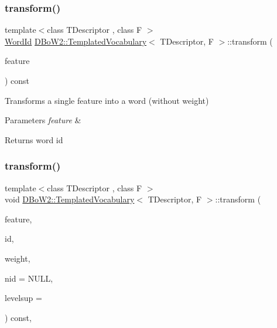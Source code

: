 \subsubsection{\texorpdfstring{transform()}{transform()}\hspace{0.1cm}{\footnotesize\ttfamily [3/5]}}
{\footnotesize\ttfamily template$<$class T\+Descriptor , class F $>$ \\
\mbox{\hyperlink{namespace_d_bo_w2_ab1a0d3283b2d4690a383372ed20bfeb5}{Word\+Id}} \mbox{\hyperlink{class_d_bo_w2_1_1_templated_vocabulary}{D\+Bo\+W2\+::\+Templated\+Vocabulary}}$<$ T\+Descriptor, F $>$\+::transform (\begin{DoxyParamCaption}\item[{const T\+Descriptor \&}]{feature }\end{DoxyParamCaption}) const\hspace{0.3cm}{\ttfamily [virtual]}}

Transforms a single feature into a word (without weight) 
\begin{DoxyParams}{Parameters}
{\em feature} & \\
\hline
\end{DoxyParams}
\begin{DoxyReturn}{Returns}
word id 
\end{DoxyReturn}
\mbox{\label{class_d_bo_w2_1_1_templated_vocabulary_a5af7e18ab438c3fbbb51bd9930c43444}} 
\subsubsection{\texorpdfstring{transform()}{transform()}\hspace{0.1cm}{\footnotesize\ttfamily [4/5]}}
{\footnotesize\ttfamily template$<$class T\+Descriptor , class F $>$ \\
void \mbox{\hyperlink{class_d_bo_w2_1_1_templated_vocabulary}{D\+Bo\+W2\+::\+Templated\+Vocabulary}}$<$ T\+Descriptor, F $>$\+::transform (\begin{DoxyParamCaption}\item[{const T\+Descriptor \&}]{feature,  }\item[{\mbox{\hyperlink{namespace_d_bo_w2_ab1a0d3283b2d4690a383372ed20bfeb5}{Word\+Id}} \&}]{id,  }\item[{\mbox{\hyperlink{namespace_d_bo_w2_a55fcd7333e591a38e96b91f41bc182f6}{Word\+Value}} \&}]{weight,  }\item[{\mbox{\hyperlink{namespace_d_bo_w2_a3a0fa9c50c0df508759362d6204566f2}{Node\+Id}} $\ast$}]{nid = {\ttfamily NULL},  }\item[{int}]{levelsup = {} }\end{DoxyParamCaption}) const\hspace{0.3cm}{\ttfamily [protected]}, {\ttfamily [virtual]}}


